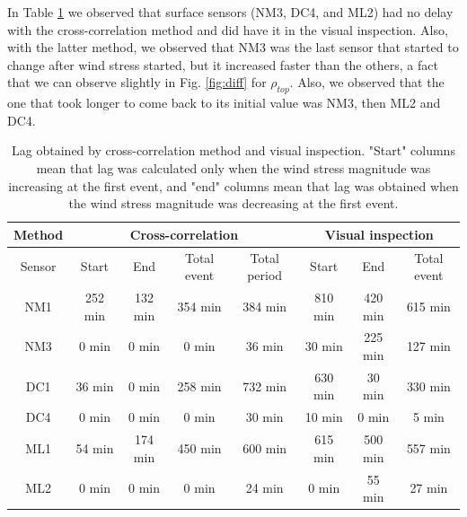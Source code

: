 \documentclass[tesis.tex]{subfiles}
\begin{document}
In Table \ref{tab:lag} we observed that surface sensors (NM3, DC4, and ML2) had no delay with the cross-correlation method and did have it in the visual inspection. Also, with the latter method, we observed that NM3 was the last sensor that started to change after wind stress started, but it increased faster than the others, a fact that we can observe slightly in Fig. \ref{fig:diff} for $\rho_{top}$. Also, we observed that the one that took longer to come back to its initial value was NM3, then ML2 and DC4.\\

\begin{table}[]
    \centering
    \caption{Lag obtained by cross-correlation method and visual inspection. "Start" columns mean that lag was calculated only when the wind stress magnitude was increasing at the first event, and "end" columns mean that lag was obtained when the wind stress magnitude was decreasing at the first event.}
    \begin{tabular}{|c|cccc|ccc|}
    \hline
    Method &
      \multicolumn{4}{c|}{Cross-correlation} &
      \multicolumn{3}{c|}{Visual inspection} \\ \hline
    Sensor &
      \multicolumn{1}{c|}{Start} &
      \multicolumn{1}{c|}{End} &
      \multicolumn{1}{c|}{Total event} &
      Total period &
      \multicolumn{1}{c|}{Start} &
      \multicolumn{1}{c|}{End} &
      Total event \\ \hline
    NM1 &
      \multicolumn{1}{c|}{252 min} &
      \multicolumn{1}{c|}{132 min} &
      \multicolumn{1}{c|}{354 min} &
      384 min &
      \multicolumn{1}{c|}{810 min} &
      \multicolumn{1}{c|}{420 min} &
      615 min \\ \hline
    NM3 &
      \multicolumn{1}{c|}{0 min} &
      \multicolumn{1}{c|}{0 min} &
      \multicolumn{1}{c|}{0 min} &
      36 min &
      \multicolumn{1}{c|}{30 min} &
      \multicolumn{1}{c|}{225 min} &
      127 min \\ \hline
    DC1 &
      \multicolumn{1}{c|}{36 min} &
      \multicolumn{1}{c|}{0 min} &
      \multicolumn{1}{c|}{258 min} &
      732 min &
      \multicolumn{1}{c|}{630 min} &
      \multicolumn{1}{c|}{30 min} &
      330 min \\ \hline
    DC4 &
      \multicolumn{1}{c|}{0 min} &
      \multicolumn{1}{c|}{0 min} &
      \multicolumn{1}{c|}{0 min} &
      30 min &
      \multicolumn{1}{c|}{10 min} &
      \multicolumn{1}{c|}{0 min} &
      5 min \\ \hline
    ML1 &
      \multicolumn{1}{c|}{54 min} &
      \multicolumn{1}{c|}{174 min} &
      \multicolumn{1}{c|}{450 min} &
      600 min &
      \multicolumn{1}{c|}{615 min} &
      \multicolumn{1}{c|}{500 min} &
      557 min \\ \hline
    ML2 &
      \multicolumn{1}{c|}{0 min} &
      \multicolumn{1}{c|}{0 min} &
      \multicolumn{1}{c|}{0 min} &
      24 min &
      \multicolumn{1}{c|}{0 min} &
      \multicolumn{1}{c|}{55 min} &
      27 min \\ \hline
    \end{tabular}
    \label{tab:lag}
    \end{table}
\end{document}
